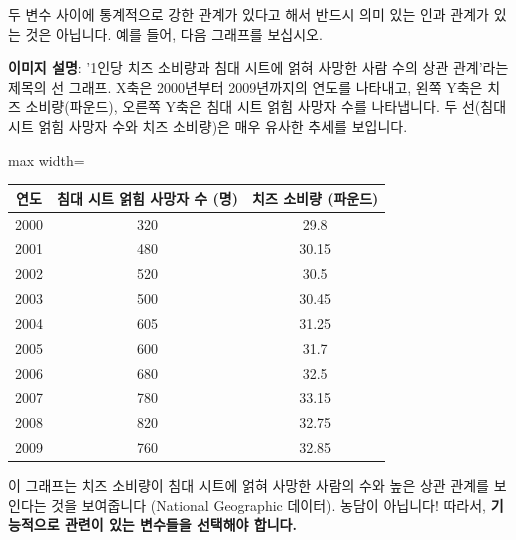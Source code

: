 \documentclass[11pt,a4paper]{article}
\theoremstyle{definition}
\begin{document}
\begin{tcolorbox}[warningbox, title=가짜 상관 관계 (Spurious Relationships)]
두 변수 사이에 통계적으로 강한 관계가 있다고 해서 반드시 의미 있는 인과 관계가 있는 것은 아닙니다. 예를 들어, 다음 그래프를 보십시오.

\begin{center}
\end{center}
\textbf{이미지 설명}: '1인당 치즈 소비량과 침대 시트에 얽혀 사망한 사람 수의 상관 관계'라는 제목의 선 그래프. X축은 2000년부터 2009년까지의 연도를 나타내고, 왼쪽 Y축은 치즈 소비량(파운드), 오른쪽 Y축은 침대 시트 얽힘 사망자 수를 나타냅니다. 두 선(침대 시트 얽힘 사망자 수와 치즈 소비량)은 매우 유사한 추세를 보입니다.

\begin{adjustbox}{max width=\textwidth}
\begin{tabular}{ccc}
\toprule
\textbf{연도} & \textbf{침대 시트 얽힘 사망자 수 (명)} & \textbf{치즈 소비량 (파운드)} \\
\midrule
2000 & 320 & 29.8 \\
2001 & 480 & 30.15 \\
2002 & 520 & 30.5 \\
2003 & 500 & 30.45 \\
2004 & 605 & 31.25 \\
2005 & 600 & 31.7 \\
2006 & 680 & 32.5 \\
2007 & 780 & 33.15 \\
2008 & 820 & 32.75 \\
2009 & 760 & 32.85 \\
\bottomrule
\end{tabular}
\end{adjustbox}
이 그래프는 치즈 소비량이 침대 시트에 얽혀 사망한 사람의 수와 높은 상관 관계를 보인다는 것을 보여줍니다 (National Geographic 데이터). 농담이 아닙니다! 따라서, \textbf{기능적으로 관련이 있는 변수들을 선택해야 합니다.}
\end{tcolorbox}
\end{document}
